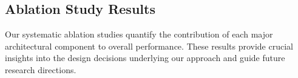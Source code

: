 \documentclass[10pt,twocolumn,letterpaper]{article}
\begin{document}

\subsection{Ablation Study Results}

Our systematic ablation studies quantify the contribution of each major architectural component to overall performance. These results provide crucial insights into the design decisions underlying our approach and guide future research directions.

\end{document}
